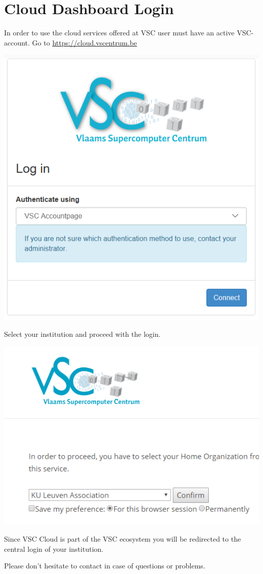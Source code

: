 \chapter{Cloud Dashboard Login}

In order to use the cloud services offered at VSC user must have an active VSC-account. Go to \url{https://cloud.vscentrum.be}

\begin{center}
\includegraphics[scale=0.7]{img/cloud_login_1.png}
\end{center}

Select your institution and proceed with the login.

\begin{center}
\includegraphics[scale=0.7]{img/cloud_login_2.png}
\end{center}

Since VSC Cloud is part of the VSC \hpc ecosystem you will be redirected to the central login of your institution.

Please don't hesitate to contact \hpcinfo in case of questions or problems.
